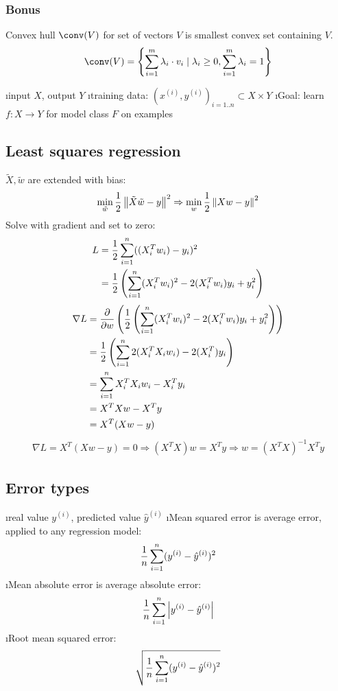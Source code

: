 \subsubsection{Bonus}

Convex hull $\conv(V)$ for set of vectors $V$ is smallest convex set containing $V$.
\[ \conv(V) = \left\{\dsum^m_{i=1} \lambda_i \cdot v_i \mid \lambda_i \geq 0, \dsum^m_{i=1} \lambda_i = 1\right\} \]


\bi
\i input $X$, output $Y$
\i training data: $(x^{(i)}, y^{(i)})_{i=1..n} \subset X \times Y$
\i Goal: learn $f: X \to Y$ for model class $F$ on examples
\ei

\subsection{Least squares regression}
$\tilde X, \tilde w$ are extended with bias:
\begin{align*}
\min_{\tilde w} \frac{1}{2} \left\lVert\tilde X \tilde w - y\right\rVert^2 \Rightarrow \min_w \frac{1}{2} \left\lVert Xw-y\right\rVert^2
\end{align*}
Solve with gradient and set to zero:
\begin{align*}
L &= \frac{1}{2} \displaystyle\sum_{i=1}^n ((X_i^Tw_i)-y_i)^2 \\
&= \frac{1}{2} \left(\displaystyle\sum_{i=1}^n (X_i^Tw_i)^2 - 2(X_i^Tw_i)y_i + y_i^2 \right) \\
\end{align*}
\begin{align*}
  \nabla L &= \frac{\partial}{\partial w} \left(  \frac{1}{2} \left(\displaystyle\sum_{i=1}^n (X_i^Tw_i)^2 - 2(X_i^Tw_i)y_i + y_i^2 \right) \right)\\
  &= \frac{1}{2} \left(\displaystyle\sum_{i=1}^n 2(X_i^TX_iw_i) - 2(X_i^T)y_i \right)\\
  &= \displaystyle\sum_{i=1}^n X_i^TX_iw_i - X_i^Ty_i\\
  &= X^TXw - X^Ty\\
  &= X^T(Xw-y)
\end{align*}
\begin{align*}
\nabla L = X^T(Xw-y) = 0 \Rightarrow (X^TX)w = X^Ty \Rightarrow w = (X^TX)^{-1}X^Ty
\end{align*}


\subsection{Error types}

\bi
\i real value $y^{(i)}$, predicted value $\hat y^{(i)}$
\i Mean squared error is average error, applied to any regression model: \[\frac{1}{n} \displaystyle\sum_{i=1}^n (y^{(i)} - \hat y^{(i)})^2\]
\i Mean absolute error is average absolute error: \[\frac{1}{n} \displaystyle\sum_{i=1}^n \left|y^{(i)} - \hat y^{(i)}\right|\]
\i Root mean squared error: \[\sqrt{\frac{1}{n} \displaystyle\sum_{i=1}^n (y^{(i)} - \hat y^{(i)})^2}\]
\ei

